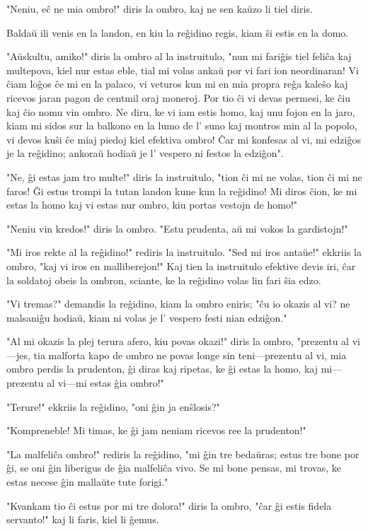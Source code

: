 "Neniu, eĉ ne mia ombro!" diris la ombro, kaj ne sen kaŭzo li tiel diris.

Baldaŭ ili venis en la landon, en kiu la reĝidino regis, kiam ŝi estis en la domo.

"Aŭskultu, amiko!" diris la ombro al la instruitulo, "nun mi fariĝis tiel feliĉa kaj multepova, kiel nur estas eble, tial mi volas ankaŭ por vi fari ion neordinaran! Vi ĉiam loĝos ĉe mi en la palaco, vi veturos kun mi en mia propra reĝa kaleŝo kaj ricevos jaran pagon de centmil oraj moneroj. Por tio ĉi vi devas permesi, ke ĉiu kaj ĉio nomu vin ombro. Ne diru, ke vi iam estis homo, kaj unu fojon en la jaro, kiam mi sidos sur la balkono en la lumo de l' suno kaj montros min al la popolo, vi devos kuŝi ĉe miaj piedoj kiel efektiva ombro! Ĉar mi konfesas al vi, mi edziĝos je la reĝidino; ankoraŭ hodiaŭ je l' vespero ni festos la edziĝon".

"Ne, ĝi estas jam tro multe!" diris la instruitulo, "tion ĉi mi ne volas, tion ĉi mi ne faros! Ĝi estus trompi la tutan landon kune kun la reĝidino! Mi diros ĉion, ke mi estas la homo kaj vi estas nur ombro, kiu portas vestojn de homo!"

"Neniu vin kredos!" diris la ombro. "Estu prudenta, aŭ mi vokos la gardistojn!"

"Mi iros rekte al la reĝidino!" rediris la instruitulo. "Sed mi iros antaŭe!" ekkriis la ombro, "kaj vi iros en malliberejon!" Kaj tien la instruitulo efektive devis iri, ĉar la soldatoj obeis la ombron, sciante, ke la reĝidino volas lin fari ŝia edzo.

"Vi tremas?" demandis la reĝidino, kiam la ombro eniris; "ĉu io okazis al vi? ne malsaniĝu hodiaŭ, kiam ni volas je l' vespero festi nian edziĝon."

"Al mi okazis la plej terura afero, kiu povas okazi!" diris la ombro, "prezentu al vi---jes, tia malforta kapo de ombro ne povas longe sin teni---prezentu al vi, mia ombro perdis la prudenton, ĝi diras kaj ripetas, ke ĝi estas la homo, kaj mi---prezentu al vi---mi estas ĝia ombro!"

"Terure!" ekkriis la reĝidino, "oni ĝin ja enŝlosis?"

"Kompreneble! Mi timas, ke ĝi jam neniam ricevos ree la prudenton!"

"La malfeliĉa ombro!" rediris la reĝidino, "mi ĝin tre bedaŭras; estus tre bone por ĝi, se oni ĝin liberigus de ĝia malfeliĉa vivo. Se mi bone pensas, mi trovas, ke estas necese ĝin mallaŭte tute forigi."

"Kvankam tio ĉi estus por mi tre dolora!" diris la ombro, "ĉar ĝi estis fidela servanto!" kaj li faris, kiel li ĝemus.

